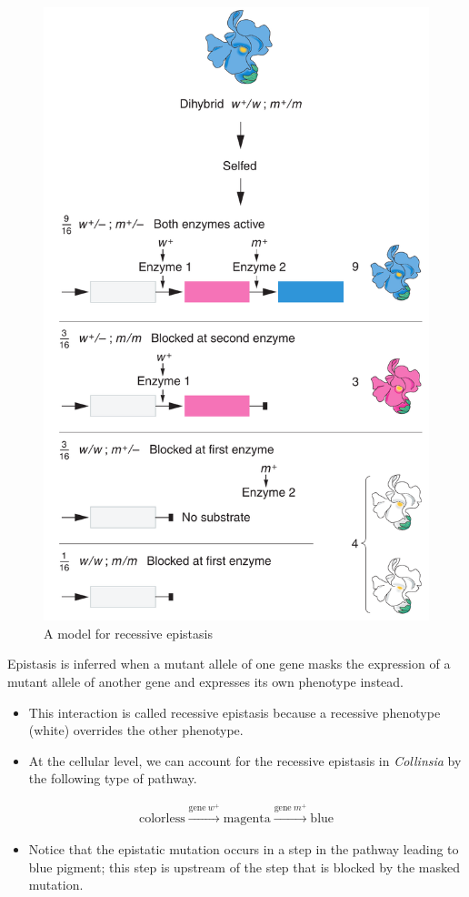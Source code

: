 \documentclass[11pt,dvipsnames,ignorenonframetext,aspectratio=169]{beamer}
\providecommand{\tightlist}{%
  \setlength{\itemsep}{0pt}\setlength{\parskip}{0pt}}
\begin{document}
\begin{frame}{}
\protect\hypertarget{section-19}{}

\begin{figure}

{\centering \includegraphics[width=0.26\linewidth]{./../images/recessive_epistasis} 

}

\caption{A model for recessive epistasis}\label{fig:recessive-epistasis}
\end{figure}

\end{frame}

\begin{frame}{}
\protect\hypertarget{section-20}{}

\begin{block}{}
Epistasis is inferred when a mutant allele of one gene masks the expression of a mutant allele of another gene and expresses its own phenotype instead.
\end{block}

\begin{itemize}
\tightlist
\item
  This interaction is called recessive epistasis because a recessive
  phenotype (white) overrides the other phenotype.
\item
  At the cellular level, we can account for the recessive epistasis in
  \emph{Collinsia} by the following type of pathway.
\end{itemize}

\[
\begin{aligned}
\textrm{colorless} \xrightarrow{\text{gene}~w^+} \textrm{magenta} \xrightarrow{\text{gene}~m^+} \textrm{blue}
\end{aligned}
\]

\begin{itemize}
\tightlist
\item
  Notice that the epistatic mutation occurs in a step in the pathway
  leading to blue pigment; this step is upstream of the step that is
  blocked by the masked mutation.
\end{itemize}

\end{frame}
\end{document}
